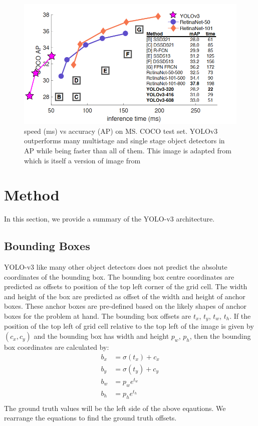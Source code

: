 \documentclass[10pt,twocolumn,letterpaper]{article}
\begin{document}
\begin{figure}[t]
	\begin{center}
		\includegraphics[width=1.0\linewidth]{object_detector_comparisons.png}
	\end{center}
	\caption{speed (ms) vs accuracy (AP) on MS. COCO test set. YOLOv3 outperforms many multistage and single stage object detectors in AP while being faster than all of them. This image is adapted from \cite{redmon2018yolov3} which is itself a version of image from \cite{retinaNet}}
	\label{fig:detector_comparison}
\end{figure}

\section{Method}
In this section, we provide a summary of the YOLO-v3 architecture.
\subsection{Bounding Boxes}
YOLO-v3 like many other object detectors does not predict the absolute coordinates of the bounding box. The bounding box centre coordinates are predicted as offsets to position of the top left corner of the grid cell. The width and height of the box are predicted as offset of the width and height of anchor boxes. These anchor boxes are pre-defined based on the likely shapes of anchor boxes for the problem at hand. The bounding box offsets are $t_x$, $t_y$, $t_w$, $t_h$. If the position of the top left of grid cell relative to the top left of the image is given by $(c_x, c_y)$ and the bounding box has width and height $p_w$, $p_h$, then the bounding box coordinates are calculated by: 
\begin{align*}
b_x &= \sigma(t_x) + c_x \\
b_y &= \sigma(t_y)  + c_y\\
b_w &= p_w e^{t_w}\\
b_h &= p_h e^{t_h}\\
\end{align*}
The ground truth values will be the left side of the above eqautions. We rearrange the equations to find the ground truth offsets.
\end{document}
